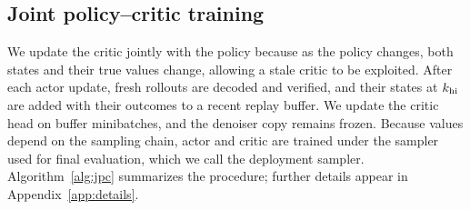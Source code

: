 \subsection{Joint policy--critic training}
\label{sec:joint}
We update the critic jointly with the policy because as the policy changes, both states and their true values change, allowing a stale critic to be exploited. After each actor update, fresh rollouts are decoded and verified, and their states at $k_{\rm hi}$ are added with their outcomes to a recent replay buffer. We update the critic head on buffer minibatches, and the denoiser copy remains frozen. Because values depend on the sampling chain, actor and critic are trained under the sampler used for final evaluation, which we call the deployment sampler. Algorithm~\ref{alg:jpc} summarizes the procedure; further details appear in Appendix~\ref{app:details}.

